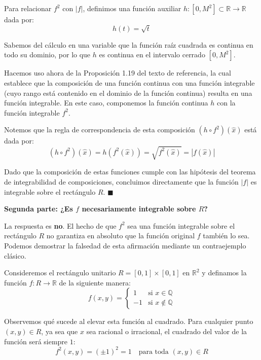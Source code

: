\documentclass[11pt,letterpaper]{article}
\begin{document}
Para relacionar $f^2$ con $|f|$, definimos una función auxiliar $h: [0, M^2] \subset \mathbb{R} \rightarrow \mathbb{R}$ dada por:
\begin{equation*}
h(t) = \sqrt{t}
\end{equation*}

Sabemos del cálculo en una variable que la función raíz cuadrada es continua en todo su dominio, por lo que $h$ es continua en el intervalo cerrado $[0, M^2]$. 

Hacemos uso ahora de la Proposición 1.19 del texto de referencia, la cual establece que la composición de una función continua con una función integrable (cuyo rango está contenido en el dominio de la función continua) resulta en una función integrable. En este caso, componemos la función continua $h$ con la función integrable $f^2$.

Notemos que la regla de correspondencia de esta composición $(h \circ f^2)(\hat{x})$ está dada por:
\begin{equation*}
(h \circ f^2)(\hat{x}) = h(f^2(\hat{x})) = \sqrt{f^2(\hat{x})} = |f(\hat{x})|
\end{equation*}

Dado que la composición de estas funciones cumple con las hipótesis del teorema de integrabilidad de composiciones, concluimos directamente que la función $|f|$ es integrable sobre el rectángulo $R$. \hfill $\blacksquare$

\vspace{0.8cm}

\textbf{Segunda parte: ¿Es $f$ necesariamente integrable sobre $R$?}

La respuesta es \textbf{no}. El hecho de que $f^2$ sea una función integrable sobre el rectángulo $R$ no garantiza en absoluto que la función original $f$ también lo sea. Podemos demostrar la falsedad de esta afirmación mediante un contraejemplo clásico.

Consideremos el rectángulo unitario $R = [0, 1] \times [0, 1]$ en $\mathbb{R}^2$ y definamos la función $f: R \rightarrow \mathbb{R}$ de la siguiente manera:
\begin{equation*}
f(x,y) = 
\begin{cases} 
1 & \text{si } x \in \mathbb{Q} \\ 
-1 & \text{si } x \notin \mathbb{Q} 
\end{cases}
\end{equation*}

Observemos qué sucede al elevar esta función al cuadrado. Para cualquier punto $(x,y) \in R$, ya sea que $x$ sea racional o irracional, el cuadrado del valor de la función será siempre $1$:
\begin{equation*}
f^2(x,y) = (\pm 1)^2 = 1 \quad \text{para toda } (x,y) \in R
\end{equation*}
\end{document}
